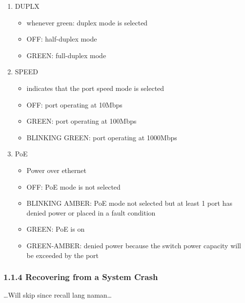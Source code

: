 \documentclass[11pt]{article}
\begin{document}
\begin{enumerate}
\item DUPLX
\begin{itemize}
\item whenever green: duplex mode is selected
\item OFF: half-duplex mode
\item GREEN: full-duplex mode
\end{itemize}
\item SPEED
\begin{itemize}
\item indicates that the  port speed mode is selected
\item OFF: port operating at 10Mbps
\item GREEN: port operating at 100Mbps
\item BLINKING GREEN: port operating at 1000Mbps
\end{itemize}
\item PoE
\begin{itemize}
\item Power over ethernet
\item OFF: PoE mode is not selected
\item BLINKING AMBER: PoE mode not selected but at least 1 port has
denied power or placed in a fault condition
\item GREEN: PoE is on
\item GREEN-AMBER: denied power because the switch power capacity will
be exceeded by the port
\end{itemize}
\end{enumerate}

\subsubsection{1.1.4 Recovering from a System Crash}
\label{sec:orgc2a5527}
\ldots{}Will skip since recall lang naman\ldots{}
\end{document}
